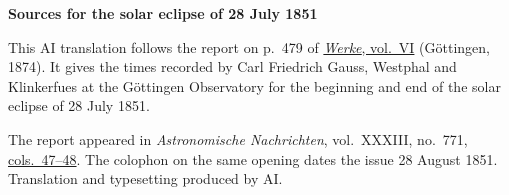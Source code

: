 \clearpage\thispagestyle{empty}
\begin{center}\textbf{Sources for the solar eclipse of 28 July 1851}\end{center}
\noindent This AI translation follows the report on p.~479 of \href{https://gdz.sub.uni-goettingen.de/id/PPN236007467}{\textit{Werke}, vol.~VI} (Göttingen, 1874). It gives the times recorded by Carl Friedrich Gauss, Westphal and Klinkerfues at the Göttingen Observatory for the beginning and end of the solar eclipse of 28 July 1851.
\par\smallskip\noindent The report appeared in \textit{Astronomische Nachrichten}, vol.~XXXIII, no.~771, \href{https://api.digitale-sammlungen.de/iiif/image/v2/bsb10049458_00030/full/1800,/0/default.jpg}{cols.~47--48}. The colophon on the same opening dates the issue 28 August 1851. Translation and typesetting produced by AI.
\clearpage

